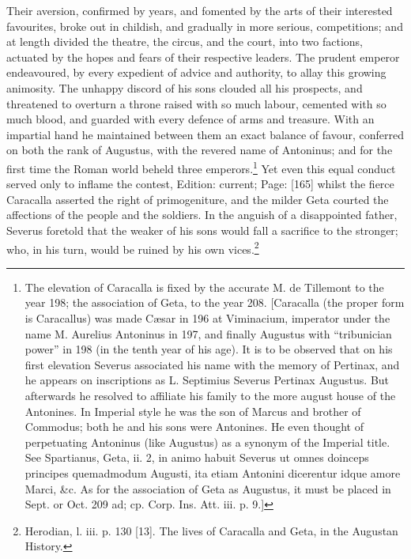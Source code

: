 Their aversion, confirmed by years, and fomented by the arts of their interested favourites, broke out in childish, and gradually in more serious, competitions; and at length divided the theatre, the circus, and the court, into two factions, actuated by the hopes and fears of their respective leaders. The prudent emperor endeavoured, by every expedient of advice and authority, to allay this growing animosity. The unhappy discord of his sons clouded all his prospects, and threatened to overturn a throne raised with so much labour, cemented with so much blood, and guarded with every defence of arms and treasure. With an impartial hand he maintained between them an exact balance of favour, conferred on both the rank of Augustus, with the revered name of Antoninus; and for the first time the Roman world beheld three emperors.\footnote{The elevation of Caracalla is fixed by the accurate M. de Tillemont to the year 198; the association of Geta, to the year 208. [Caracalla (the proper form is Caracallus) was made Cæsar in 196 at Viminacium, imperator under the name M. Aurelius Antoninus in 197, and finally Augustus with \texthebrew{“}tribunician power\texthebrew{}” in 198 (in the tenth year of his age). It is to be observed that on his first elevation Severus associated his name with the memory of Pertinax, and he appears on inscriptions as L. Septimius Severus Pertinax Augustus. But afterwards he resolved to affiliate his family to the more august house of the Antonines. In Imperial style he was the son of Marcus and brother of Commodus; both he and his sons were Antonines. He even thought of perpetuating Antoninus (like Augustus) as a synonym of the Imperial title. See Spartianus, Geta, ii. 2, in animo habuit Severus ut omnes doinceps principes quemadmodum Augusti, ita etiam Antonini dicerentur idque amore Marci, \&c. As for the association of Geta as Augustus, it must be placed in Sept. or Oct. 209 ad; cp. Corp. Ins. Att. iii. p. 9.]} Yet even this equal conduct served only to inflame the contest, Edition: current; Page: [165] whilst the fierce Caracalla asserted the right of primogeniture, and the milder Geta courted the affections of the people and the soldiers. In the anguish of a disappointed father, Severus foretold that the weaker of his sons would fall a sacrifice to the stronger; who, in his turn, would be ruined by his own vices.\footnote{Herodian, l. iii. p. 130 [13]. The lives of Caracalla and Geta, in the Augustan History.}

